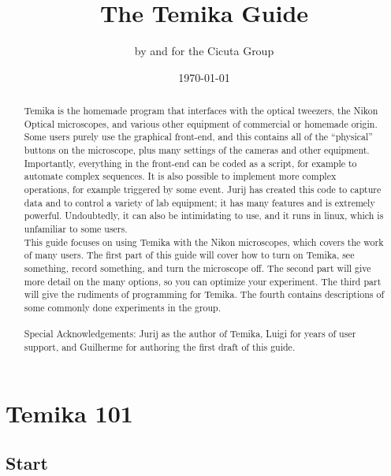 \documentclass{report}
\author{by and for the Cicuta Group}
\title{The Temika Guide}
\date{\today}
\begin{document}
\begin{minipage}{\textwidth}
\maketitle
\begin{abstract}
Temika is the homemade program that interfaces with the optical tweezers, the Nikon Optical microscopes, and various other equipment of commercial or homemade origin.   Some users purely use the graphical front-end, and this contains all of the ``physical'' buttons on the microscope, plus many settings of the cameras and other equipment.   Importantly, everything in the front-end can be coded as a script, for example to automate complex sequences.   It is also possible to implement more complex operations, for example triggered by some event.   Jurij has created this code to capture data and to control a variety of lab equipment; it  has many features and is extremely powerful.    Undoubtedly, it can also be intimidating to use, and it runs in linux, which is unfamiliar to some users.\\

This guide focuses on using Temika with the Nikon microscopes, which covers the work of many users.  The first part of this guide will cover how to turn on Temika, see something, record something, and turn the microscope off. The second part will give more detail on the many options, so you can optimize your experiment. The third part will give the rudiments of programming for Temika. The fourth contains descriptions of some commonly done experiments in the group.  \\
\vspace{0.5cm}\\
Special Acknowledgements: Jurij as the author of Temika, Luigi for years of user support, and Guilherme for authoring the first draft of this guide.
\end{abstract}
\end{minipage}

\tableofcontents






\chapter{Temika 101}

\section{Start}
\end{document}
